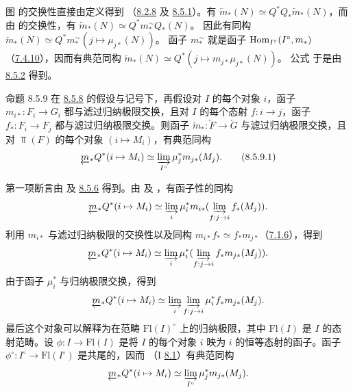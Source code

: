 图  的交换性直接由定义得到
（\hyperref[VI.subsubsec8.2.8]{8.2.8} 及 \hyperref[VI.subsubsec8.5.1]{8.5.1}）。有
$\underleftarrow{m}_{\ast}(N)\simeq Q^{\ast}Q_{\ast}\underleftarrow{m}_{\ast}(N)$，而由
 的交换性，有
$\underleftarrow{m}_{\ast}(N)\simeq Q^{\ast}m^{\sim}_{\ast}Q_{\ast}(N)$。
因此有同构 $\underleftarrow{m}_{\ast}(N)\simeq Q^{\ast}m^{\sim}_{\ast}(j\mapsto\mu_{j\ast}(N))$。
函子 $m_{\ast}^{\sim}$ 就是函子 $\operatorname{Hom}_{I^{\circ}}(I^{\circ},m_{\ast})$
（\hyperref[VI.prop7.4.10]{7.4.10}），因而有典范同构
$\underleftarrow{m}_{\ast}(N)\simeq Q^{\ast}(j\mapsto m_{j\ast}\mu_{j\ast}(N))$。
公式  于是由 \hyperref[VI.prop8.5.2]{8.5.2} 得到。

\begin{enonce*}{命题 8.5.9}
在 \hyperref[VI.prop8.5.8]{8.5.8} 的假设与记号下，再假设对 $I$ 的每个对象 $i$，函子
$m_{i\ast}:F_i\to G_i$ 都与滤过归纳极限交换，且对 $I$ 的每个态射 $f:i\to j$，函子
$f_{\ast}:F_i\to F_j$ 都与滤过归纳极限交换。则函子
$\underleftarrow{m}_{\ast}:\underleftarrow{F}\to\underleftarrow{G}$ 与滤过归纳极限交换，且对
$\Top(F)$ 的每个对象 $(i\mapsto M_i)$，有典范同构
\begin{equation*}
\underleftarrow{m}_{\ast} Q^{\ast} (i \mapsto M_i) \simeq
\varinjlim_{I^{\circ}} \mu^{\ast}_j m_{j\ast} (M_j){}.\tag{8.5.9.1}
\end{equation*}
\end{enonce*}

第一项\pageoriginale{}断言由  及
\hyperref[VI.cor8.5.6]{8.5.6} 得到。由  及
，有函子性的同构
$$
\underleftarrow{m}_{\ast} Q^{\ast} (i \mapsto M_i) \simeq
\varinjlim_i \mu^{\ast}_{i} m_{i\ast} (\varinjlim_{f
  : j \to i} f_{\ast} (M_{j})){\quoi}.
$$
利用 $m_{i\ast}$ 与滤过归纳极限的交换性以及同构
$m_{i\ast}f_{\ast}\simeq f_{\ast}m_{j\ast}$（\hyperref[VI.subsubsec7.1.6]{7.1.6}），得到
$$
\underleftarrow{m}_{\ast} Q^{\ast} (i \mapsto M_i) \simeq
\varinjlim_i \mu^{\ast}_{i} (\varinjlim_{f : j \to
  i} f_{\ast} m_{j\ast} (M_j)){\quoi}.
$$
由于函子 $\mu_i^{\ast}$ 与归纳极限交换，得到
$$
\underleftarrow{m}_{\ast}Q^{\ast}(i\mapsto M_{i})\simeq \varinjlim_{i}
\varinjlim_{f:j\to i} \mu^{\ast}_{i}f_{\ast}m_{j\ast}(M_{j}){\quoi}.
$$
最后这个对象可以解释为在范畴 $\text{Fl}(I)^{\circ}$ 上的归纳极限，其中
$\text{Fl}(I)$ 是 $I$ 的态射范畴。设 $\phi:I\to\text{Fl}(I)$ 是将 $I$ 的每个对象 $i$ 映为
$i$ 的恒等态射的函子。函子 $\phi^{\circ}:I^{\circ}\to\text{Fl}(I^{\circ})$ 是共尾的，因而
（I \hyperref[I.sec8.1]{8.1}）有典范同构
$$
\underleftarrow{m}_{\ast} Q^{\ast} (i \mapsto M_i) \simeq
\varinjlim_{I^{\circ}} \mu^{\ast}_{j} m_{j\ast}(M_j){}.
$$


